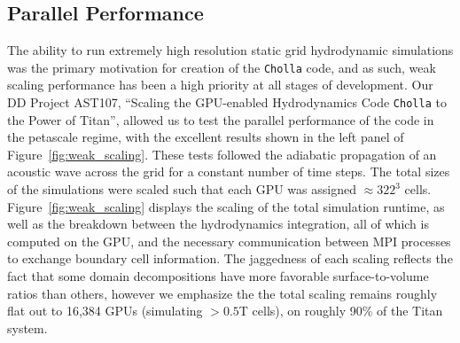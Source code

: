 \documentclass[11pt,letterpaper,english]{article}
\begin{document}
\vspace{-.25in}
\subsection{Parallel Performance}
\vspace{-.2in}





The ability to run extremely high resolution static grid hydrodynamic simulations was the primary motivation for creation of the {\tt Cholla} code, and as such, weak scaling performance has been a high priority at all stages of development. Our DD Project AST107, ``Scaling the GPU-enabled Hydrodynamics Code {\tt Cholla} to the Power of Titan'', allowed us to test the parallel performance of the code in the petascale regime, with the excellent results shown in the left panel of Figure~\ref{fig:weak_scaling}. These tests followed the adiabatic propagation of an acoustic wave across the grid for a constant number of time steps. The total sizes of the simulations were scaled such that each GPU was assigned $\approx 322^3$ cells. Figure~\ref{fig:weak_scaling} displays the scaling of the total simulation runtime, as well as the breakdown between the hydrodynamics integration, all of which is computed on the GPU, and the necessary communication between MPI processes to exchange boundary cell information. The jaggedness of each scaling reflects the fact that some domain decompositions have more favorable surface-to-volume ratios than others, however we emphasize the the total scaling remains roughly flat out to 16,384 GPUs (simulating $>0.5$T cells), on roughly 90\% of the Titan system.
\end{document}
